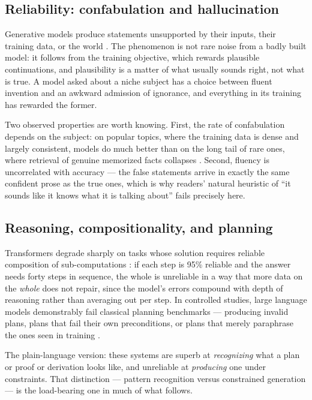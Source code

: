 \documentclass[11pt,a4paper]{article}
\begin{document}
\subsection{Reliability: confabulation and hallucination}
\label{sec:hallucination}

Generative models produce statements unsupported by their inputs, their
training data, or the world \autocite{ji2023survey,mallen2023trust}. The
phenomenon is not rare noise from a badly built model: it follows from the
training objective, which rewards plausible continuations, and plausibility
is a matter of what usually sounds right, not what is true. A model asked
about a niche subject has a choice between fluent invention and an awkward
admission of ignorance, and everything in its training has rewarded the
former.

Two observed properties are worth knowing. First, the rate of confabulation
depends on the subject: on popular topics, where the training data is dense
and largely consistent, models do much better than on the long tail of
rare ones, where retrieval of genuine memorized facts collapses
\autocite{mallen2023trust}. Second, fluency is uncorrelated with accuracy ---
the false statements arrive in exactly the same confident prose as the true
ones, which is why readers' natural heuristic of ``it sounds like it knows
what it is talking about'' fails precisely here.

\subsection{Reasoning, compositionality, and planning}
\label{sec:reasoning}

Transformers degrade sharply on tasks whose solution requires reliable
composition of sub-computations \autocite{dziri2023faith}: if each step is
95\% reliable and the answer needs forty steps in sequence, the whole is
unreliable in a way that more data on the \emph{whole} does not repair, since
the model's errors compound with depth of reasoning rather than averaging out
per step. In controlled studies, large language models demonstrably fail
classical planning benchmarks --- producing invalid plans, plans that fail
their own preconditions, or plans that merely paraphrase the ones seen in
training \autocite{valmeekam2023planning,kambhampati2024llms}.

The plain-language version: these systems are superb at \emph{recognizing}
what a plan or proof or derivation looks like, and unreliable at
\emph{producing} one under constraints. That distinction --- pattern
recognition versus constrained generation --- is the load-bearing one in much
of what follows.
\end{document}
